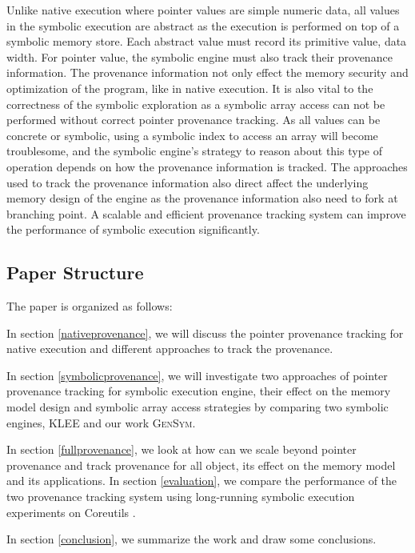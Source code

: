 \documentclass[sigplan, nonacm]{acmart}\settopmatter{printfolios=true,printccs=false,printacmref=false}
\newcommand{\tool}{\textsc{GenSym}\xspace}
\newcommand{\klee}{\textsc{KLEE}\xspace}
\begin{document}
Unlike native execution where pointer values are simple numeric data, all values in the symbolic execution are abstract as the execution is performed on top of a symbolic memory store. Each abstract value must record its primitive value, data width. For pointer value, the symbolic engine must also track their provenance information. The provenance information not only effect the memory security and optimization of the program, like in native execution. It is also vital to the correctness of the symbolic exploration as a symbolic array access can not be performed without correct pointer provenance tracking. As all values can be concrete or symbolic, using a symbolic index to access an array will become troublesome, and the symbolic engine's strategy to reason about this type of operation depends on how the provenance information is tracked. The approaches used to track the provenance information also direct affect the underlying memory design of the engine as the provenance information also need to fork at branching point. A scalable and efficient provenance tracking system can improve the performance of symbolic execution significantly.\par
\subsection{Paper Structure}
The paper is organized as follows: \par \par
In section \ref{nativeprovenance}, we will discuss the pointer provenance tracking for native execution and different approaches to track the provenance.\par
In section \ref{symbolicprovenance}, we will investigate two approaches of pointer provenance tracking for symbolic execution engine, their effect on the memory model design and symbolic array access strategies by comparing two symbolic engines, \klee \cite{cadar2008klee} and our work \tool.\par
In section \ref{fullprovenance}, we look at how can we scale beyond pointer provenance and track provenance for all object, its effect on the memory model and its applications.
In section \ref{evaluation}, we compare the performance of the two provenance tracking system using long-running symbolic execution experiments on Coreutils \cite{coreutilsweb}.\par
In section \ref{conclusion}, we summarize the work and draw some conclusions.
\end{document}
